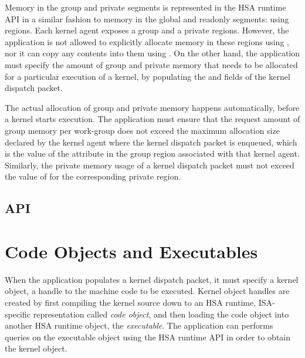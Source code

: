 \documentclass[final,oneside]{book}
\begin{document}
Memory in the group and private segments is represented in the HSA runtime API
in a similar fashion to memory in the global and readonly segments: using
regions. Each kernel agent exposes a group and a private regions. However, the
application is not allowed to explicitly allocate memory in these regions using
, nor it can copy any contents into them using
. On the other hand, the application must specify the
amount of group and private memory that needs to be allocated for a particular
execution of a kernel, by populating the
 and
 fields of the kernel
dispatch packet.

The actual allocation of group and private memory happens automatically, before
a kernel starts execution. The application must ensure that the request amount
of group memory per work-group does not exceed the maximum allocation size
declared by the kernel agent where the kernel dispatch packet is enqueued, which
is the value of the  attribute in the
group region associated with that kernel agent. Similarly, the private memory
usage of a kernel dispatch packet must not exceed the value of
 for the corresponding private region.

\subsection{API}



\section{Code Objects and Executables}\label{sec:codeobjects}

When the application populates a kernel dispatch packet, it must specify a
kernel object, a handle to the machine code to be executed. Kernel object
handles are created by first compiling the kernel source down to an HSA runtime,
ISA-specific representation called \textit{code object}, and then loading the
code object into another HSA runtime object, the \textit{executable}. The
application can performs queries on the executable object using the HSA runtime
API in order to obtain the kernel object.
\end{document}
